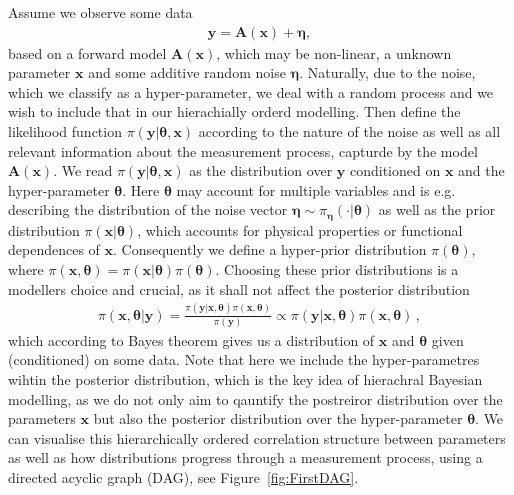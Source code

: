 Assume we observe some data
\begin{align}
	\bm{y} = \bm{A} (\bm{x}) + \bm{\eta},
	\label{eq:LinDat}
\end{align}
based on a forward model $\bm{A}(\bm{x})$, which may be non-linear, a unknown parameter $\bm{x}$ and some additive random noise $\bm{\eta}$.
Naturally, due to the noise, which we classify as a hyper-parameter, we deal with a random process and we wish to include that in our hierachially orderd modelling.
Then define the likelihood function $\pi(\bm{y}|\bm{\theta},\bm{x})$ according to the nature of the noise as well as all relevant information about the measurement process, capturde by the model $\bm{A}(\bm{x})$.
We read $\pi(\bm{y}|\bm{\theta},\bm{x})$ as the distribution over $\bm{y}$ conditioned on $\bm{x}$ and the hyper-parameter $\bm{\theta}$.
Here $\bm{\theta}$ may account for multiple variables and is e.g. describing the distribution of the noise vector $\bm{\eta} \sim \pi_{\bm{\eta}}(\cdot|\bm{\theta})$ as well as the prior distribution $\pi(\bm{x}|\bm{\theta})$, which accounts for physical properties or functional dependences of $\bm{x}$.
Consequently we define a hyper-prior distribution $\pi(\bm{\theta})$, where $\pi(\bm{x}, \bm{\theta}) = \pi(\bm{x}|\bm{\theta}) \pi(\bm{\theta}) $.
Choosing these prior distributions is a modellers choice and crucial, as it shall not affect the posterior distribution 
\begin{align}
	\pi(\bm{x},\bm{\theta}|\bm{y}) = \frac{ \pi(\bm{y} | \bm{x}, \bm{\theta} ) \pi(\bm{x}, \bm{\theta})}{\pi(\bm{y})} \propto \pi(\bm{y} | \bm{x}, \bm{\theta} ) \pi(\bm{x}, \bm{\theta}) \, ,
\end{align}
which according to Bayes theorem gives us a distribution of $\bm{x}$ and $\bm{\theta}$ given (conditioned) on some data.
Note that here we include the hyper-parametres wihtin the posterior distribution, which is the key idea of hierachral Bayesian modelling, as we do not only aim to qauntify the postreiror distribution over the parameters $\bm{x}$ but also the posterior distribution over the hyper-parameter $\bm{\theta}$.
We can visualise this hierarchically ordered correlation structure between parameters as well as how distributions progress through a measurement process, using a directed acyclic graph (DAG), see Figure~\ref{fig:FirstDAG}.

